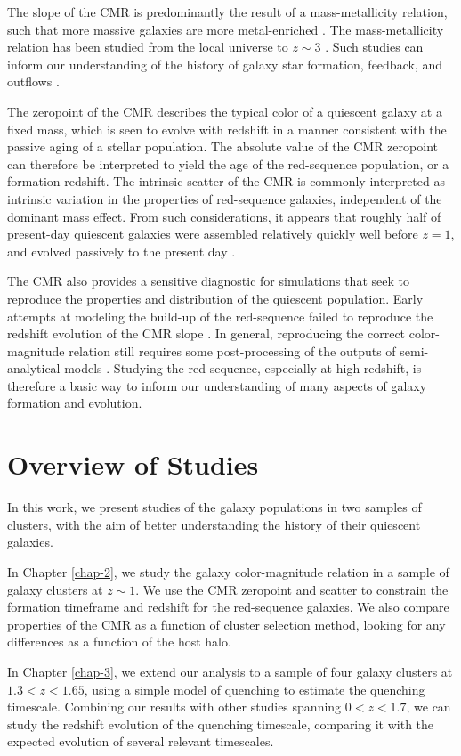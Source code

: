 The slope of the CMR is predominantly the result of a mass-metallicity relation, such that more massive galaxies are more metal-enriched \citep[e.g.,][]{Bower:1992mb,Kodama:1997rr,Vazdekis:2001aa,2003AJ....125.1866B}.
The mass-metallicity relation has been studied from the local universe to $z\sim3$ \citep{Tremonti:2004aa,Kewley:2008aa,Andrews:2013aa,Erb:2006aa,Maiolino:2008aa,DeGroot:2016aa}.
Such studies can inform our understanding of the history of galaxy star formation, feedback, and outflows \citep{Finlator:2008aa,Peeples:2011aa}.

The zeropoint of the CMR describes the typical color of a quiescent galaxy at a fixed mass, which is seen to evolve with redshift in a manner consistent with the passive aging of a stellar population.
The absolute value of the CMR zeropoint can therefore be interpreted to yield the age of the red-sequence population, or a formation redshift.
The intrinsic scatter of the CMR is commonly interpreted as intrinsic variation in the properties of red-sequence galaxies, independent of the dominant mass effect.
From such considerations, it appears that roughly half of present-day quiescent galaxies were assembled relatively quickly well before $z=1$, and evolved passively to the present day \citep[e.g.,][]{Bower:1998cr,Peebles:2002aa,2003ApJ...596L.143B,Mei:2009wt,Foltz:2015aa}.

The CMR also provides a sensitive diagnostic for simulations that seek to reproduce the properties and distribution of the quiescent population.
Early attempts at modeling the build-up of the red-sequence failed to reproduce the redshift evolution of the CMR slope \citep{Romeo:2008aa,Menci:2008aa}.
In general, reproducing the correct color-magnitude relation still requires some post-processing of the outputs of semi-analytical models \citep[see e.g.][]{Ascaso:2015aa}.
Studying the red-sequence, especially at high redshift, is therefore a basic way to inform our understanding of many aspects of galaxy formation and evolution.

\section{Overview of Studies}

In this work, we present studies of the galaxy populations in two samples of clusters, with the aim of better understanding the history of their quiescent galaxies.

In Chapter \ref{chap-2}, we study the galaxy color-magnitude relation in a sample of galaxy clusters at $z\sim1$.
We use the CMR zeropoint and scatter to constrain the formation timeframe and redshift for the red-sequence galaxies.
We also compare properties of the CMR as a function of cluster selection method, looking for any differences as a function of the host halo.

In Chapter \ref{chap-3}, we extend our analysis to a sample of four galaxy clusters at $1.3 < z < 1.65$, using a simple model of quenching to estimate the quenching timescale.
Combining our results with other studies spanning $0 < z < 1.7$, we can study the redshift evolution of the quenching timescale, comparing it with the expected evolution of several relevant timescales.
